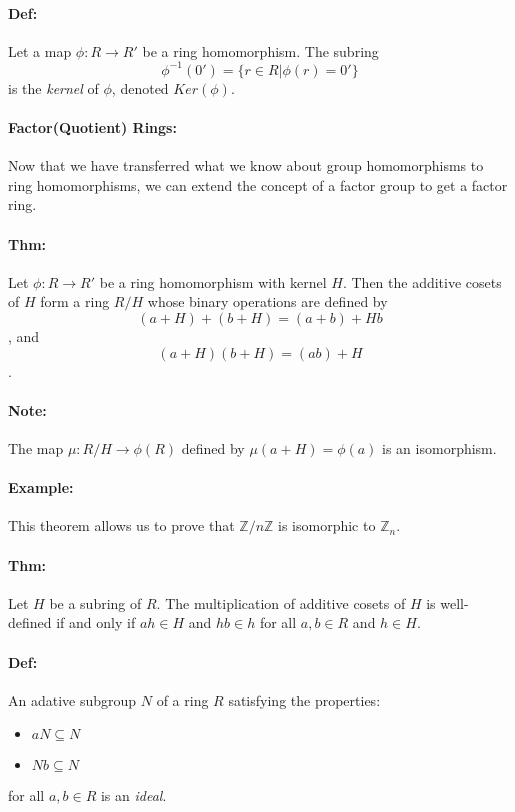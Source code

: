 \documentclass[10pt,a4paper]{article}
\begin{document}
\paragraph{Def:} Let a map $\phi: R \to R'$ be a ring homomorphism. The subring $$\phi^{-1}(0') = \{r \in R | \phi(r) = 0'\} $$ is the \textit{kernel} of $\phi$, denoted $Ker(\phi)$.

\paragraph{Factor(Quotient) Rings:} Now that we have transferred what we know about group homomorphisms to ring homomorphisms, we can extend the concept of a factor group to get a factor ring. 

\paragraph{Thm:} Let $\phi:R \to R'$ be a ring homomorphism with kernel $H$. Then the additive cosets of $H$ form a ring $R/H$ whose binary operations are defined by $$ (a+H)+(b+H) = (a+b)+Hb$$, and $$(a+H)(b+H) = (ab)+H$$.

\paragraph{Note:} The map $\mu: R/H \to \phi(R)$ defined by $\mu(a+H) = \phi(a)$ is an isomorphism.

\paragraph{Example:} This theorem allows us to prove that $\mathbb{Z}/n\mathbb{Z}$ is isomorphic to $\mathbb{Z}_n$.

\paragraph{Thm:} Let $H$ be a subring of $R$. The multiplication of additive cosets of $H$ is well-defined if and only if $ah \in H$ and $hb \in h$ for all $a,b \in R$ and $h \in H$.

\paragraph{Def:} An adative subgroup $N$ of a ring $R$ satisfying the properties:
\begin{itemize}
\item $aN \subseteq N$\\
\item $Nb \subseteq N$
\end{itemize}
for all $a,b \in R$ is an \textit{ideal}.
\end{document}
